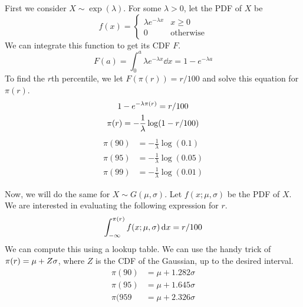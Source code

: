 \documentclass{article}
\begin{document}
    \begin{solution}
        First we consider $X \sim \exp(\lambda)$. For some $\lambda > 0$, let the PDF of $X$ be 
        \begin{equation*}
            f(x) = \begin{cases}
                    \lambda e^{-\lambda x} & x \geq 0 \\
                    0 & \mathrm{otherwise}
                    \end{cases}
        \end{equation*}
        We can integrate this function to get its CDF $F$.
        \begin{equation*}
            F(a) = \int_0^a \lambda e^{-\lambda x} \dd{x} = 1 - e^{-\lambda a}
        \end{equation*}
        To find the $r$th percentile, we let $F(\pi(r)) = r/100$ and solve this equation for $\pi(r)$.
        \begin{gather*}
            1 - e^{-\lambda \pi(r)} = r/100 \\
            \pi(r) = -\frac{1}{\lambda} \log(1 - r/100)
        \end{gather*}
        \begin{align}
            \pi(90) &=  -\frac{1}{\lambda} \log(0.1) \\
            \pi(95) &=  -\frac{1}{\lambda} \log(0.05) \\
            \pi(99) &=  -\frac{1}{\lambda} \log(0.01)
        \end{align}

        Now, we will do the same for $X \sim G(\mu, \sigma)$. Let $f(x; \mu, \sigma)$ be the PDF of $X$. We are interested in evaluating the following expression for $r$.
        \begin{equation*}
            \int_{-\infty} ^{\pi(r)}  f(x; \mu, \sigma) \dd{x} = r/100
        \end{equation*}
        We can compute this using a lookup table. We can use the handy trick of $\pi(r) = \mu + Z\sigma$, where $Z$ is the CDF of the Gaussian, up to the desired interval.
        \begin{align}
            \pi(90) &=  \mu + 1.282\sigma\\
            \pi(95) &=  \mu + 1.645\sigma \\
            \pi(959 &=  \mu + 2.326\sigma
        \end{align}
                
    \end{solution}
\end{document}
